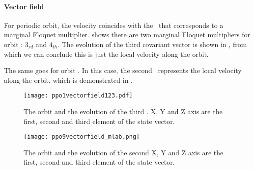 	\paragraph{Vector field }
		For periodic orbit, the velocity coincides with the \cLv\ that corresponds to
		a marginal Floquet multiplier.  shows there are two
		marginal Floquet multipliers for orbit : $3_{rd}$ and $4_{th}$. The evolution of the third covariant
		vector is shown in , from which we can conclude this
		{\cLv} is just the local velocity along the orbit.
		
		The same goes for orbit . In this case, the second \cLv\ represents the local
		velocity along the orbit, which is demonstrated in .
		\begin{figure}[h]
		\centering
			\texttt{[image: ppo1vectorfield123.pdf]}
			\caption{The orbit  and the evolution of the third \cLv. X, Y and Z axis
			are the first, second and third element of the state vector.
			}
			\label{fig:ppo1vectorfield123}
		\end{figure}

		\begin{figure}[h]
		\centering
			\texttt{[image: ppo9vectorfield\_mlab.png]}
			\caption{The orbit  and the evolution of the second \cLv\. X, Y and Z axis
			are the first, second and third element of the state vector.
			}
			\label{fig:ppo9vectorfield123}
		\end{figure}

